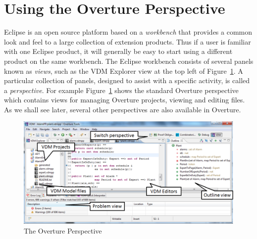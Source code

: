 \section{Using the Overture Perspective}\label{sec:vdmsupport}
Eclipse is an open source platform based on a \emph{workbench} that provides a common look and feel to a large collection of extension products. Thus if a user is familiar with one Eclipse product, it will generally be easy to start using a different product on the same workbench. The Eclipse workbench consists of several panels known as \emph{views}, such as the VDM Explorer view at the top left of Figure~\ref{fig:OverturePerspective}. A particular collection of panels, designed to assist with a specific activity, is called a \emph{perspective}. For example Figure~\ref{fig:OverturePerspective} shows the standard Overture perspective which contains views for managing Overture projects, viewing and editing files. As we shall see later, several other perspectives are also available in Overture.
%
\begin{figure}[!htb]
\begin{center}
  \includegraphics[width=5in]{figures/OverturePerspective}
  \caption[labelInTOC]{The Overture Perspective}
  \label{fig:OverturePerspective}
\end{center}
\end{figure}

